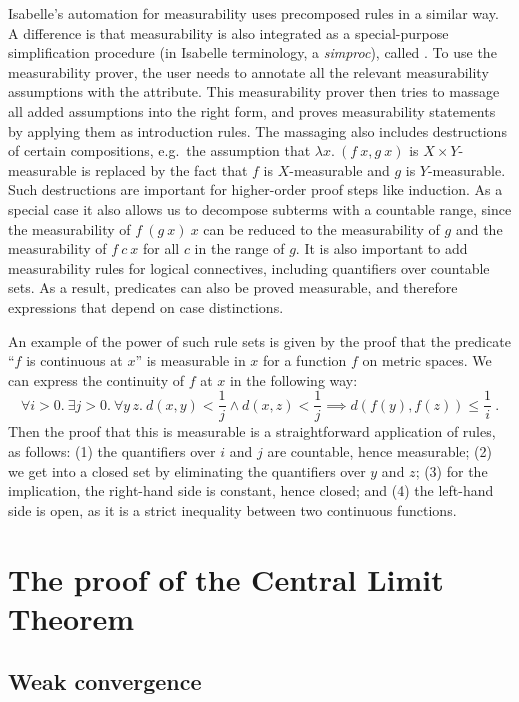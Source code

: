 \documentclass{svjour3}
\begin{document}
Isabelle's automation for measurability uses precomposed rules in a similar way. A difference is that measurability is also integrated as a special-purpose simplification procedure (in Isabelle terminology, a \emph{simproc}), called . To use the measurability prover, the user needs to annotate all the relevant measurability assumptions with the \isa{[measurable]} attribute. This measurability prover then tries to massage all added assumptions into the right form, and proves measurability statements by applying them as introduction rules. The massaging also includes destructions of certain compositions, e.g.~the assumption that $\lambda x.~(f~x, g~x)$ is $X \times Y$-measurable is replaced by the fact that $f$ is $X$-measurable and $g$ is $Y$-measurable. Such destructions are important for higher-order proof steps like induction. As a special case it also allows us to decompose subterms with a countable range, since the measurability of $f~(g~x)~x$ can be reduced to the measurability of $g$ and the measurability of $f~c~x$ for all $c$ in the range of $g$. It is also important to add measurability rules for logical connectives, including quantifiers over countable sets. As a result, predicates can also be proved measurable, and therefore expressions that depend on case distinctions.

An example of the power of such rule sets is given by the proof that the predicate ``$f$ is continuous at $x$'' is measurable in $x$ for a function $f$ on metric spaces. We can express the continuity of $f$ at $x$ in the following way:
%
\[ \forall i>0.~ \exists j>0.~ \forall y\,z.~ d(x, y) < \frac{1}{j} \land
  d(x, z) < \frac{1}{j} \implies d(f(y), f(z)) \le \frac{1}{i}~. \]
%
Then the proof that this is measurable is a straightforward application of rules, as follows: (1) the quantifiers over $i$ and $j$ are countable, hence measurable; (2) we get into a closed set by eliminating the quantifiers over $y$ and $z$; (3) for the implication, the right-hand side is constant, hence closed; and (4) the left-hand side is open, as it is a strict inequality between two continuous functions.

\section{The proof of the Central Limit Theorem}
\label{section:formal}

\subsection{Weak convergence}
\label{subsection:weak:convergence}
\end{document}
